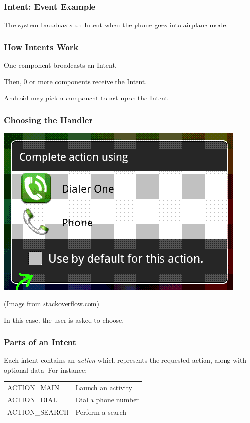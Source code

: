 \begin{frame}
\frametitle{Intent: Event Example}
\begin{changemargin}{1cm}

The system broadcasts an Intent when the phone
goes into airplane mode.

\end{changemargin}
\end{frame}

\begin{frame}
\frametitle{How Intents Work}
\begin{changemargin}{1cm}
 One component broadcasts an Intent. 

Then, 0 or more components receive the Intent. 

Android may pick a component
to act upon the Intent.

\end{changemargin}
\end{frame}

\begin{frame}
\frametitle{Choosing the Handler}
\begin{changemargin}{1cm}
\begin{center}
\includegraphics[height=.5\textheight]{images/completeaction.png}
\end{center}
(Image from stackoverflow.com)

In this case, the user is asked to choose.

\end{changemargin}
\end{frame}


\begin{frame}
\frametitle{Parts of an Intent}
\begin{changemargin}{1cm}

Each intent contains an \emph{action} which represents the requested
action, along with optional data. For instance:

\hspace*{2em} \begin{tabular}{ll}
ACTION\_MAIN & Launch an activity \\
ACTION\_DIAL & Dial a phone number \\
ACTION\_SEARCH & Perform a search
\end{tabular}

\end{changemargin}
\end{frame}


